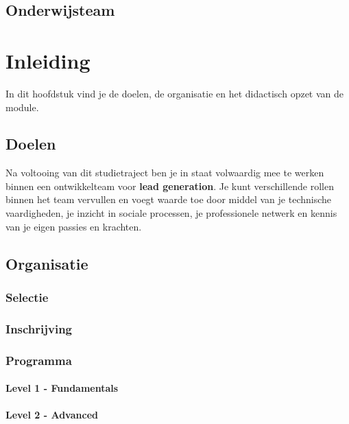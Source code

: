 \documentclass[]{book}
\begin{document}
\section{Onderwijsteam}\label{onderwijsteam}

\chapter{Inleiding}\label{inleiding}

In dit hoofdstuk vind je de doelen, de organisatie en het didactisch
opzet van de module.

\section{Doelen}\label{doelen}

Na voltooing van dit studietraject ben je in staat volwaardig mee te
werken binnen een ontwikkelteam voor \textbf{lead generation}. Je kunt
verschillende rollen binnen het team vervullen en voegt waarde toe door
middel van je technische vaardigheden, je inzicht in sociale processen,
je professionele netwerk en kennis van je eigen passies en krachten.

\section{Organisatie}\label{organisatie}

\subsection{Selectie}\label{selectie}

\subsection{Inschrijving}\label{inschrijving}

\subsection{Programma}\label{programma}

\subsubsection{Level 1 - Fundamentals}\label{level-1---fundamentals}

\subsubsection{Level 2 - Advanced}\label{level-2---advanced}
\end{document}
